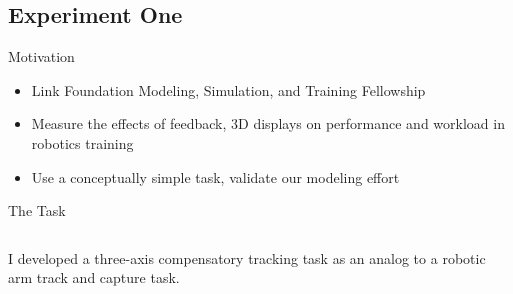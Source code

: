 \documentclass[10pt]{beamer}
\begin{document}
\subsection{Experiment One}

\begin{frame}[fragile]{Motivation}
  \begin{itemize}
    \setlength\itemsep{1em}
    \item Link Foundation Modeling, Simulation, and Training Fellowship
    \item Measure the effects of feedback, 3D displays on performance and workload in robotics training
    \item Use a conceptually simple task, validate our modeling effort
  \end{itemize}
\end{frame}

\begin{frame}[fragile]{The Task}
  \begin{columns}[T]
    \begin{column}{.8\textwidth}
      I developed a three-axis compensatory tracking task as an analog to a robotic arm track and capture task.
    \end{column}
  \end{columns}
\end{frame}
\end{document}
